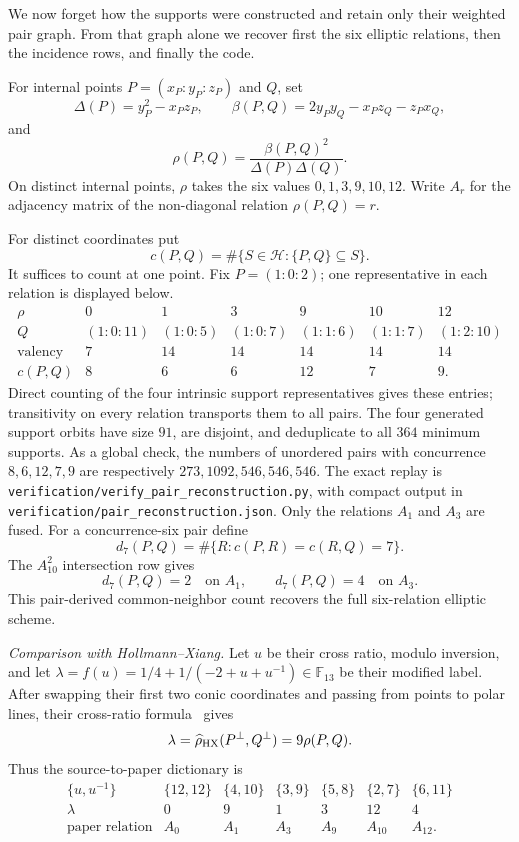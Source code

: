 \documentclass[11pt]{article}
\theoremstyle{definition}
\theoremstyle{remark}
\newcommand{\F}{\mathbb F}
\begin{document}
We now forget how the supports were constructed and retain only their weighted
pair graph.  From that graph alone we recover first the six elliptic relations,
then the incidence rows, and finally the code.

For internal points \(P=(x_P:y_P:z_P)\) and \(Q\), set
\[
 \Delta(P)=y_P^2-x_Pz_P,\qquad
 \beta(P,Q)=2y_Py_Q-x_Pz_Q-z_Px_Q,
\]
and
\[
 \rho(P,Q)=\frac{\beta(P,Q)^2}{\Delta(P)\Delta(Q)}.
\]
On distinct internal points, \(\rho\) takes the six values
\(0,1,3,9,10,12\).  Write \(A_r\) for the adjacency matrix of the
non-diagonal relation \(\rho(P,Q)=r\).

For distinct coordinates put
\[
 c(P,Q)=\#\{S\in\mathcal H:\{P,Q\}\subseteq S\}.
\]
It suffices to count at one point.  Fix
\(P=(1:0:2)\); one representative in each relation is displayed below.
\[
\begin{array}{c|cccccc}
\rho&0&1&3&9&10&12\\ \hline
Q&(1:0:11)&(1:0:5)&(1:0:7)&(1:1:6)&(1:1:7)&(1:2:10)\\
\text{valency}&7&14&14&14&14&14\\
c(P,Q)&8&6&6&12&7&9.
\end{array}
\]
Direct counting of the four intrinsic support representatives gives these
entries; transitivity on every relation transports them to all pairs.  The
four generated support orbits have size \(91\), are disjoint, and deduplicate
to all \(364\) minimum supports.  As a global check, the numbers of unordered
pairs with concurrence \(8,6,12,7,9\) are respectively
\(273,1092,546,546,546\).  The exact replay is
\nolinkurl{verification/verify_pair_reconstruction.py}, with compact output
in \nolinkurl{verification/pair_reconstruction.json}.
Only the relations \(A_1\) and \(A_3\) are fused.  For a concurrence-six
pair define
\[
 d_7(P,Q)=\#\{R:c(P,R)=c(R,Q)=7\}.
\]
The \(A_{10}^2\) intersection row gives
\[
 d_7(P,Q)=2\quad\text{on }A_1,
 \qquad d_7(P,Q)=4\quad\text{on }A_3.
\]
This pair-derived common-neighbor count recovers the full six-relation elliptic
scheme.

\smallskip
\noindent\emph{Comparison with Hollmann--Xiang.}
Let \(u\) be their cross ratio, modulo inversion, and let
\(\lambda=f(u)=1/4+1/(-2+u+u^{-1})\in\F_{13}\) be their modified label.  After swapping
their first two conic coordinates and passing from points to polar lines,
their cross-ratio formula~\cite[Theorem~5.3]{HollmannXiang2006} gives
\[
 \lambda=\widehat\rho_{\rm HX}(P^\perp,Q^\perp)=9\rho(P,Q).
\]
Thus the source-to-paper dictionary is
\[
\begin{array}{c|rrrrrr}
\{u,u^{-1}\}&\{12,12\}&\{4,10\}&\{3,9\}&\{5,8\}&\{2,7\}&\{6,11\}\\ \hline
\lambda&0&9&1&3&12&4\\
\text{paper relation}&A_0&A_1&A_3&A_9&A_{10}&A_{12}.
\end{array}
\]
\end{document}
